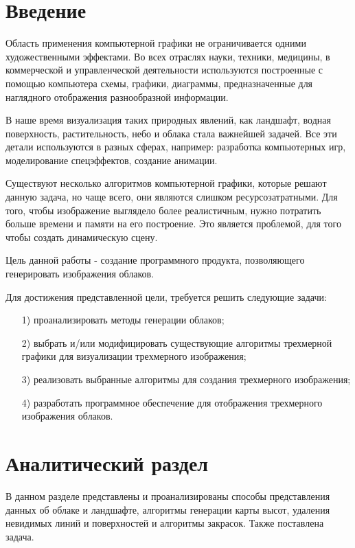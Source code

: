 \documentclass[14pt, a4paper]{extarticle}
\begin{document}
\section*{Введение}
Область применения компьютерной графики не ограничивается одними художественными эффектами. Во всех отраслях науки, техники, медицины, в коммерческой и управленческой деятельности используются построенные с помощью компьютера схемы, графики, диаграммы, предназначенные для наглядного отображения разнообразной информации.\par
В наше время визуализация таких природных явлений, как ландшафт, водная поверхность, растительность, небо и облака стала важнейшей задачей. Все эти детали используются в разных сферах, например: разработка компьютерных игр, моделирование спецэффектов, создание анимации.\par
Существуют несколько алгоритмов компьютерной графики, которые решают данную задача, но чаще всего, они являются слишком ресурсозатратными. Для того, чтобы изображение выглядело более реалистичным, нужно потратить больше времени и памяти на его построение. Это является проблемой, для того чтобы создать динамическую сцену.\par
Цель данной работы - создание программного продукта, позволяющего генерировать изображения облаков.\par
Для достижения представленной цели, требуется решить следующие задачи:
\begin{enumerate}
	\item[1)] проанализировать методы генерации облаков;
	\item[2)] выбрать и/или модифицировать существующие алгоритмы трехмерной графики для визуализации трехмерного изображения;
	\item[3)] реализовать выбранные алгоритмы для создания трехмерного изображения;
	\item[4)] разработать программное обеспечение для отображения трехмерного изображения облаков.
\end{enumerate}

\section{Аналитический раздел}
В данном разделе представлены и проанализированы способы представления данных об облаке и ландшафте, алгоритмы генерации карты высот, удаления невидимых линий и поверхностей и алгоритмы закрасок. Также поставлена задача.
\end{document}
